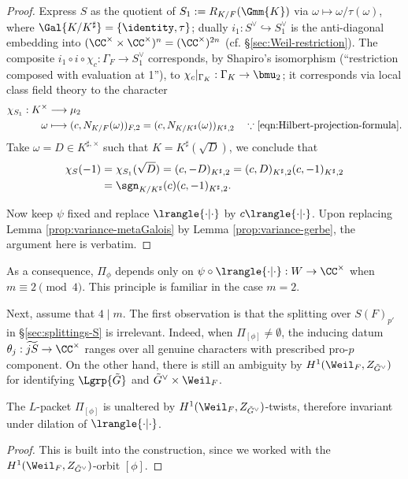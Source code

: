 \documentclass[a4paper,10pt]{article}
\begin{document}
\begin{proof}
	Express $S$ as the quotient of $S_1 := R_{K/F}(\Gmm{K})$ via $\omega \mapsto \omega/\tau(\omega)$, where $\Gal{K/K^\sharp} = \{\identity, \tau \}$; dually $i_1: S^\vee \hookrightarrow S_1^\vee$ is the anti-diagonal embedding into $(\CC^\times \times \CC^\times)^n = (\CC^\times)^{2n}$ (cf. \S\ref{sec:Weil-restriction}). The composite $i_1 \circ i \circ \chi_c: \Gamma_F \to S_1^\vee$ corresponds, by Shapiro's isomorphism (``restriction composed with evaluation at 1''), to $\chi_c|_{\Gamma_K}: \Gamma_K \to \bmu_2$; it corresponds via local class field theory to the character
	\begin{align*}
		\chi_{S_1}: K^\times & \longrightarrow \mu_2 \\
		\omega & \longmapsto (c, N_{K/F}(\omega))_{F,2} = (c, N_{K/K^\sharp}(\omega))_{K^\sharp, 2} \quad \because\text{\text{\eqref{eqn:Hilbert-projection-formula}}}.
	\end{align*}
	Take $\omega = D \in K^{\sharp, \times}$ such that $K = K^\sharp(\sqrt{D})$, we conclude that
	\begin{align*}
		\chi_S(-1) & = \chi_{S_1}(\sqrt{D}) = (c, -D)_{K^\sharp, 2} = (c, D)_{K^\sharp, 2} (c, -1)_{K^\sharp, 2} \\
		& = \sgn_{K/K^\sharp}(c) (c, -1)_{K^\sharp, 2}.
	\end{align*}
	
	Now keep $\psi$ fixed and replace $\lrangle{\cdot|\cdot}$ by $c\lrangle{\cdot|\cdot}$. Upon replacing Lemma \ref{prop:variance-metaGalois} by Lemma \ref{prop:variance-gerbe}, the argument here is verbatim.
\end{proof}

\begin{remark}
	As a consequence, $\Pi_\phi$ depends only on $\psi \circ \lrangle{\cdot|\cdot}: W \to \CC^\times$ when $m \equiv 2 \pmod 4$. This principle is familiar in the case $m=2$.
\end{remark}

Next, assume that $4 \mid m$. The first observation is that the splitting over $S(F)_{p'}$ in \S\ref{sec:splittings-S} is irrelevant. Indeed, when $\Pi_{[\phi]} \neq \emptyset$, the inducing datum $\theta_j: \widetilde{jS} \to \CC^\times$ ranges over all genuine characters with prescribed pro-$p$ component. On the other hand, there is still an ambiguity by $H^1(\Weil_F, Z_{\tilde{G}^\vee})$ for identifying $\Lgrp{\tilde{G}}$ and $\tilde{G}^\vee \times \Weil_F$.

\begin{theorem}
	The $L$-packet $\Pi_{[\phi]}$ is unaltered by $H^1(\Weil_F, Z_{\tilde{G}^\vee})$-twists, therefore invariant under dilation of $\lrangle{\cdot|\cdot}$.
\end{theorem}
\begin{proof}
	This is built into the construction, since we worked with the $H^1(\Weil_F, Z_{\tilde{G}^\vee})$-orbit $[\phi]$.
\end{proof}
\end{document}
